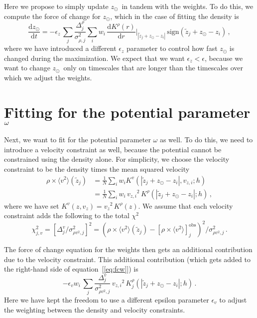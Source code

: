 \documentclass[12pt,preprint]{aastex}
\newcommand{\dd}{\mathrm{d}}
\newcommand{\eqnname}{equation}
\newcommand{\equationname}{\eqnname}
\newcommand{\zsun}{\ensuremath{z_\odot}}
\newcommand{\vz}{\ensuremath{v_z}}
\newcommand{\vzi}{\ensuremath{v_{z,i}}}
\newcommand{\zi}{\ensuremath{z_i}}
\newcommand{\wi}{\ensuremath{w_i}}
\newcommand{\zobs}{\ensuremath{\tilde{z}}}
\newcommand{\eps}{\ensuremath{\epsilon}}
\begin{document}
Here we propose to simply update \zsun\ in tandem with the weights. To
do this, we compute the force of change for \zsun, which in the case
of fitting the density is
\begin{equation}
\frac{\dd \zsun}{\dd t} = -\eps_z\,\sum_j \frac{\Delta^\rho_j}{\sigma_{\rho,j}^2} \sum_i w_i\,\frac{\dd K^\rho(r)}{\dd r}\Bigg|_{|\zobs_j+\zsun-\zi|}\,\mathrm{sign}(\zobs_j+\zsun-\zi)\,,
\end{equation}
where we have introduced a different $\eps_z$ parameter to control how
fast $\zsun$ is changed during the maximization. We expect that we
want $\eps_z < \eps$, because we want to change \zsun\ only on
timescales that are longer than the timescales over which we adjust
the weights.

\section{Fitting for the potential parameter $\protect\omega$}

Next, we want to fit for the potential parameter $\omega$ as well. To
do this, we need to introduce a velocity constraint as well, because
the potential cannot be constrained using the density alone. For
simplicity, we choose the velocity constraint to be the density times
the mean squared velocity
\begin{equation}
\begin{split}
  \rho\times\langle v^2 \rangle (\zobs_j) & = \frac{1}{N}\sum_i \wi K^v(|\zobs_j+\zsun - \zi|,\vzi;h)\\
  & = \frac{1}{N}\sum_i \wi\,\vzi^2\, K^\rho(|\zobs_j+\zsun - \zi|;h)\,,
\end{split}
\end{equation}
where we have set $K^v(z,\vz) = \vz^2\,K^\rho(z)$. We assume that each
velocity constraint adds the following to the total $\chi^2$
\begin{equation}
\chi^2_{j,v} = [\Delta^v_j/\sigma_{\rho v^2,j}^2]^2 = \left(\rho\times\langle v^2 \rangle (\zobs_j)-[\rho\times\langle v^2 \rangle]_j^{\mathrm{obs}}\right)^2/\sigma_{\rho v^2,j}^2\,.
\end{equation}

The force of change equation for the weights then gets an additional
contribution due to the velocity constraint. This additional
contribution (which gets added to the right-hand side of
\equationname~[\ref{eq:fcw}]) is
\begin{equation}\label{eq:fcwv2}
    -\eps_v \wi \,\sum_j \frac{\Delta^v_j}{\sigma_{\rho v^2,j}^2}\, \vzi^2\,K^\rho_j(|\zobs_j+\zsun - \zi|;h)\,.
\end{equation}
Here we have kept the freedom to use a different epsilon parameter
$\eps_v$ to adjust the weighting between the density and velocity
constraints.
\end{document}
